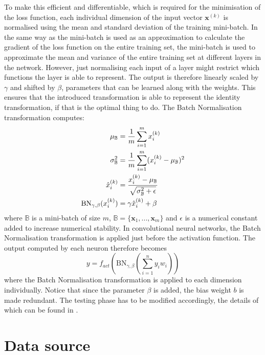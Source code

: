 \documentclass[12pt,a4paper,twoside,openright]{report}
\begin{document}
To make this efficient and differentiable, which is required for the minimisation of the loss function, each individual dimension of the input vector $\textbf{x}^{(k)}$ is normalised using the mean and standard deviation of the training mini-batch. In the same way as the mini-batch is used as an approximation to calculate the gradient of the loss function on the entire training set, the mini-batch is used to approximate the mean and variance of the entire training set at different layers in the network. However, just normalising each input of a layer might restrict which functions the layer is able to represent. The output is therefore linearly scaled by $\gamma$ and shifted by $\beta$, parameters that can be learned along with the weights. This ensures that the introduced transformation is able to represent the identity transformation, if that is the optimal thing to do. The Batch Normalisation transformation computes:
\begin{equation}
\begin{split}
	\mu_{\mathbb{B}}  & = \frac{1}{m}\sum_{i=1}^m x^{(k)}_i \\	
	\sigma^2_{\mathbb{B}}  & = \frac{1}{m}\sum_{i=1}^m (x^{(k)}_i - \mu_{\mathbb{B}})^2 \\	
	\hat{x}^{(k)}_i & = \cfrac{x^{(k)}_i - \mu_{\mathbb{B}}}{\sqrt{\sigma^2_{\mathbb{B}} + \epsilon}} \\
	\textrm{BN}_{\gamma, \beta}(x^{(k)}_i) & = \gamma \hat{x}^{(k)}_i + \beta
\end{split}
\end{equation}
where $\mathbb{B}$ is a mini-batch of size $m$, $\mathbb{B} = \{ \textbf{x}_1, ... , \textbf{x}_m \}$ and $\epsilon$ is a numerical constant added to increase numerical stability.
In convolutional neural networks, the Batch Normalisation transformation is applied just before the activation function. The output computed by each neuron therefore becomes
\begin{equation}
		y = f_{act}(\textrm{BN}_{\gamma, \beta}(\sum_{i=1}^{n} y_i w_i))
\end{equation}
where the Batch Normalisation transformation is applied to each dimension individually. Notice that since the parameter $\beta$ is added, the bias weight $b$ is made redundant. The testing phase has to be modified accordingly, the details of which can be found in \cite{batch_normalization}.

\section{Data source}
\end{document}

